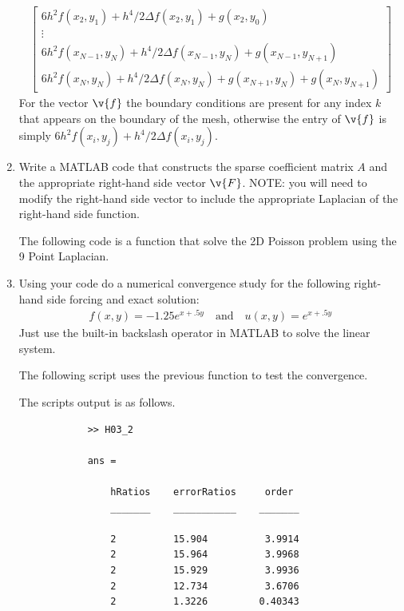 \documentclass[11pt, oneside, titlepage]{article}
\begin{document}
\begin{enumerate}
\begin{align*}
\begin{bmatrix}
                6h^2 f(x_2, y_1) + h^4/2 \Delta f(x_2, y_1) + g(x_2, y_0) \\
                \vdots   \\
                6h^2 f(x_{N-1}, y_N) + h^4/2 \Delta f(x_{N-1}, y_N) + g(x_{N-1}, y_{N+1})  \\
                6h^2 f(x_N, y_N) + h^4/2 \Delta f(x_N, y_N) + g(x_{N+1}, y_N) + g(x_N, y_{N+1})
            \end{bmatrix}
        \end{align*}
        For the vector $\v{f}$ the boundary conditions are present for any
        index $k$ that appears on the boundary of the mesh, otherwise
        the entry of $\v{f}$ is simply $6h^2 f(x_i, y_j) + h^4/2 \Delta f(x_i, y_j)$.

    \item %
        Write a MATLAB code that constructs the sparse coefficient matrix $A$
        and the appropriate right-hand side vector $\v{F}$.
        NOTE: you will need to modify the right-hand side vector to include
        the appropriate Laplacian of the right-hand side function.

        The following code is a function that solve the 2D Poisson problem
        using the 9 Point Laplacian.
        

    \item %
        Using your code do a numerical convergence study for the following
        right-hand side forcing and exact solution:
        \begin{align*}
            f(x,y) = -1.25e^{x + .5y}\quad\text{and}\quad u(x,y) = e^{x + .5y}
        \end{align*}
        Just use the built-in backslash operator in MATLAB to solve the linear
        system.

        The following script uses the previous function to test the convergence.
        
        The scripts output is as follows.
        \begin{verbatim}
            >> H03_2

            ans = 

                hRatios    errorRatios     order 
                _______    ___________    _______

                2          15.904          3.9914
                2          15.964          3.9968
                2          15.929          3.9936
                2          12.734          3.6706
                2          1.3226         0.40343
        \end{verbatim}


\end{enumerate}
\end{document}

